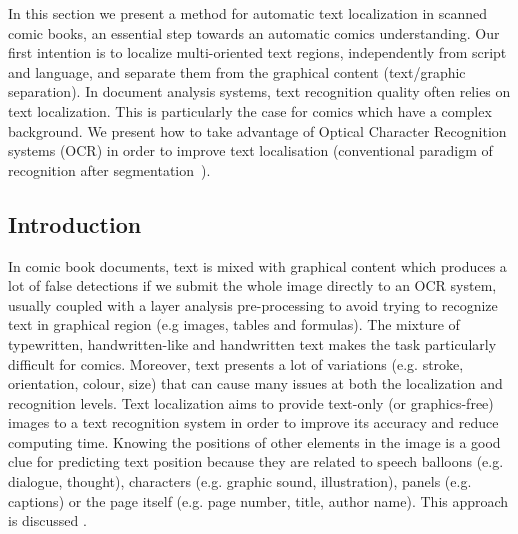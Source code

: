In this section we present a method for automatic text localization in scanned comic books, an essential step towards an automatic comics understanding.
Our first intention is to localize multi-oriented text regions, independently from script and language, and separate them from the graphical content (text/graphic separation).
In document analysis systems, text recognition quality often relies on text localization.
This is particularly the case for comics which have a complex background.
We present how to take advantage of Optical Character Recognition systems (OCR) in order to improve text localisation (conventional paradigm of recognition after segmentation~\cite{Yoon2001Paradigm}).

\subsection{Introduction} %
\label{sub:in:text_introduction}

In comic book documents, text is mixed with graphical content which produces a lot of false detections if we submit the whole image directly to an OCR system, usually coupled with a layer analysis pre-processing to avoid trying to recognize text in graphical region (e.g images, tables and formulas).
The mixture of typewritten, handwritten-like and handwritten text makes the task particularly difficult for comics.
Moreover, text presents a lot of variations (e.g. stroke, orientation, colour, size) that can cause many issues at both the localization and recognition levels.
Text localization aims to provide text-only (or graphics-free) images to a text recognition system in order to improve its accuracy and reduce computing time.
Knowing the positions of other elements in the image is a good clue for predicting text position because they are related to speech balloons (e.g. dialogue, thought), characters (e.g. graphic sound, illustration), panels (e.g. captions) or the page itself (e.g. page number, title, author name).
This approach is discussed .

